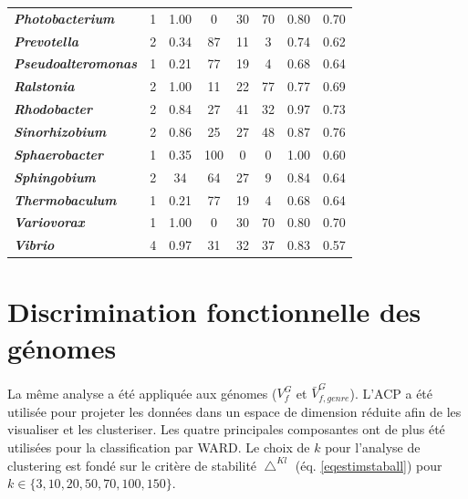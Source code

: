 \begin{table}[H]
\begin{center}
\begin{tabular}{>{\bfseries\itshape}l|ccccccc}
		\textit{Photobacterium} & 1 & 1.00 & 0 & 30 & 70 & 0.80 & 0.70 \\
		\rowcolor{Cchr} \textit{Prevotella} & 2 & 0.34 & 87 & 11 & 3 & 0.74 & 0.62 \\
		\textit{Pseudoalteromonas} & 1 & 0.21 & 77 & 19 & 4 & 0.68 & 0.64 \\
		\textit{Ralstonia} & 2 & 1.00 & 11 & 22 & 77 & 0.77 & 0.69 \\
		\rowcolor{Cpl} \textit{Rhodobacter} & 2 & 0.84 & 27 & 41 & 32 & 0.97 & 0.73 \\
		\rowcolor{Cpl} \textit{Sinorhizobium} & 2 & 0.86 & 25 & 27 & 48 & 0.87 & 0.76 \\
		\textit{Sphaerobacter} & 1 & 0.35 & 100 & 0 & 0 & 1.00 & 0.60 \\
		\rowcolor{Cpl} \textit{Sphingobium} & 2 & 34 & 64 & 27 & 9 & 0.84 & 0.64 \\
		\textit{Thermobaculum} & 1 & 0.21 & 77 & 19 & 4 & 0.68 & 0.64 \\
		\textit{Variovorax} & 1 & 1.00 & 0 & 30 & 70 & 0.80 & 0.70 \\
		\textit{Vibrio} & 4 & 0.97 & 31 & 32 & 37 & 0.83 & 0.57 \\
	\end{tabular}
	\end{center}
\end{table}	

\section{Discrimination fonctionnelle des génomes} 

	La même analyse a été appliquée aux génomes ($V_{f}^{G}$ et $\bar{V}_{f,genre}^{G}$). L'ACP a été utilisée pour projeter les données dans un espace de dimension réduite afin de les visualiser et les clusteriser. Les quatre principales composantes ont de plus été utilisées pour la classification par WARD. Le choix de $k$ pour l'analyse de clustering est fondé sur le critère de stabilité $\bigtriangleup^{Kl}$ (éq. \ref{eqestimstaball}) pour $k \in \{3,10,20,50,70,100,150\}$. 
	 
